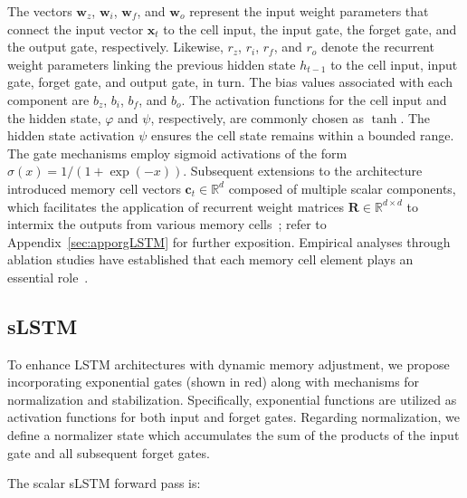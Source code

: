 The vectors $\mathbf{w}_{z}$, $\mathbf{w}_{i}$, $\mathbf{w}_{f}$, and $\mathbf{w}_{o}$ represent the input weight parameters that connect the input vector $\mathbf{x}_t$ to the cell input, the input gate, the forget gate, and the output gate, respectively. Likewise, $r_{z}$, $r_{i}$, $r_{f}$, and $r_{o}$ denote the recurrent weight parameters linking the previous hidden state $h_{t-1}$ to the cell input, input gate, forget gate, and output gate, in turn. The bias values associated with each component are $b_{z}$, $b_{i}$, $b_{f}$, and $b_{o}$. The activation functions for the cell input and the hidden state, $\varphi$ and $\psi$, respectively, are commonly chosen as $\tanh$. The hidden state activation $\psi$ ensures the cell state remains within a bounded range. The gate mechanisms employ sigmoid activations of the form $\sigma \left( x \right)= 1/(1+\exp(-x))$. Subsequent extensions to the architecture introduced memory cell vectors $\mathbf{c}_t \in \mathbb{R}^{d}$ composed of multiple scalar components, which facilitates the application of recurrent weight matrices $\mathbf{R} \in \mathbb{R}^{d \times d}$ to intermix the outputs from various memory cells~\citep{Greff:15}; refer to Appendix~\ref{sec:apporgLSTM} for further exposition. Empirical analyses through ablation studies have established that each memory cell element plays an essential role~\citep{Greff:15}.

\subsection{sLSTM}
\label{sec:sLSTM}

To enhance LSTM architectures with dynamic memory adjustment, we propose incorporating exponential gates (shown in red) along with mechanisms for normalization and stabilization. Specifically, exponential functions are utilized as activation functions for both input and forget gates. Regarding normalization, we define a normalizer state which accumulates the sum of the products of the input gate and all subsequent forget gates.

The scalar sLSTM forward pass is:

